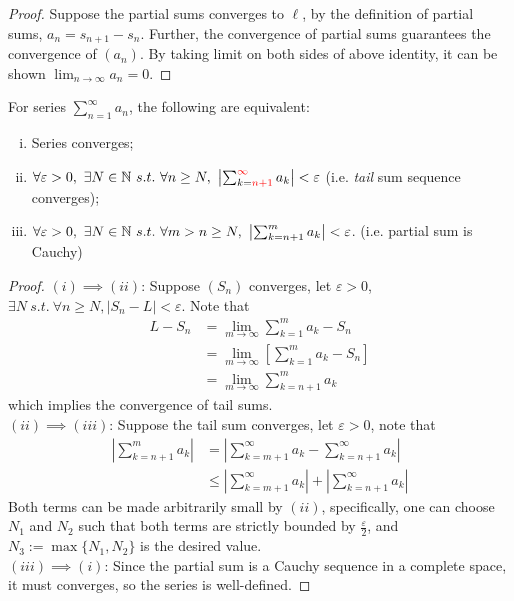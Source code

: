 \documentclass[11pt]{article}
\begin{document}
	\begin{proof}
		Suppose the partial sums converges to $\ell$, by the definition of partial sums, $a_n = s_{n+1} - s_{n}$. Further, the convergence of partial sums guarantees the convergence of $(a_n)$. By taking limit on both sides of above identity, it can be shown $\lim_{n \to \infty} a_n = 0$.
	\end{proof}
	
	\begin{theorem}
		For series $\sum_{n=1}^\infty a_n$, the following are equivalent:
		\begin{enumerate}[(i)]
			\item Series converges;
			\item $\forall \varepsilon > 0,\ \exists N \in \mathbb{N}\ s.t.\ \forall n \geq N,\ \left |\sum_{k=\textcolor{red}{n+1}}^{\textcolor{red}{\infty}} a_k \right | < \varepsilon$ (i.e. \emph{tail} sum sequence converges);
			\item $\forall \varepsilon > 0,\ \exists N \in \mathbb{N}\ s.t.\ \forall m > n \geq N,\ \left | \sum_{k=n+1}^m a_k \right | < \varepsilon$. (i.e. partial sum is Cauchy)
		\end{enumerate}
	\end{theorem}
	\begin{proof}
		$(i) \implies (ii)$: Suppose $(S_n)$ converges, let $\varepsilon > 0$, $\exists N\ s.t.\ \forall n \geq N, |S_n - L| < \varepsilon$. Note that 
		\begin{align}
			L - S_n &= \lim_{m \to \infty} \sum_{k=1}^m a_k  - S_n \\
			&= \lim_{m \to \infty} \left [ \sum_{k=1}^m a_k  - S_n \right ]\\
			&= \lim_{m \to \infty} \sum_{k=n+1}^m a_k
		\end{align}
		which implies the convergence of tail sums. \\
		$(ii) \implies (iii)$: Suppose the tail sum converges, let $\varepsilon > 0$, note that
		\begin{align}
			\left | 
			\sum_{k=n+1}^{m} a_k
			\right| &= \left |
			\sum_{k=m+1}^\infty a_k - \sum_{k=n+1}^\infty a_k
			\right| \\
			&\leq \left |
			\sum_{k=m+1}^\infty a_k \right | + \left | \sum_{k=n+1}^\infty a_k
			\right|
		\end{align}
		Both terms can be made arbitrarily small by $(ii)$, specifically, one can choose $N_1$ and $N_2$ such that both terms are strictly bounded by $\frac{\varepsilon}{2}$, and $N_3 := \max\{N_1, N_2\}$ is the desired value. \\
		$(iii) \implies (i)$: Since the partial sum is a Cauchy sequence in a complete space, it must converges, so the series is well-defined.
	\end{proof}
	
\end{document}
